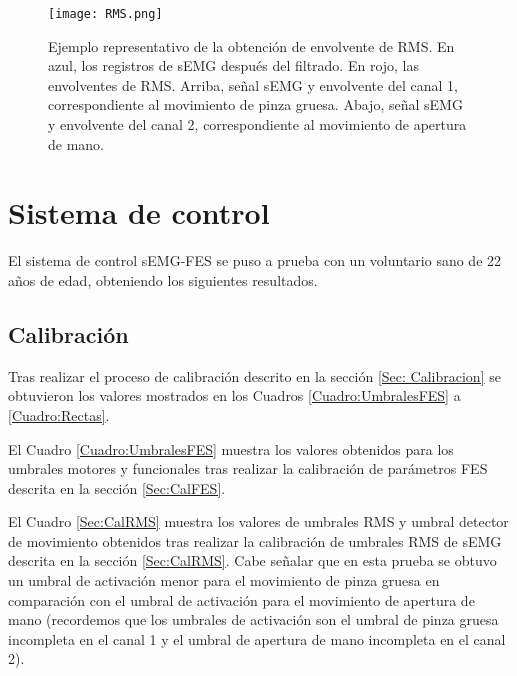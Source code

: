 
\begin{figure}[htbp]
	\centering
	\texttt{[image: RMS.png]}
	\caption[Ejemplo representativo de la obtención de envolvente de RMS]{Ejemplo representativo de la obtención de envolvente de RMS. En azul, los registros de sEMG después del filtrado. En rojo, las envolventes de RMS. Arriba, señal sEMG y envolvente del canal 1, correspondiente al movimiento de pinza gruesa. Abajo, señal sEMG y envolvente del canal 2, correspondiente al movimiento de apertura de mano.}
	\label{Figura: RMS}
\end{figure}


\newpage
\section{Sistema de control}
El sistema de control sEMG-FES se puso a prueba con un voluntario sano de 22 años de edad, obteniendo los siguientes resultados.

\subsection{Calibración}
Tras realizar el proceso de calibración descrito en la sección \ref{Sec: Calibracion} se obtuvieron los valores mostrados en los Cuadros \ref{Cuadro:UmbralesFES} a \ref{Cuadro:Rectas}.

El Cuadro \ref{Cuadro:UmbralesFES} muestra los valores obtenidos para los umbrales motores y funcionales tras realizar la calibración de parámetros FES descrita en la sección \ref{Sec:CalFES}.

El Cuadro \ref{Sec:CalRMS} muestra los valores de umbrales RMS y umbral detector de movimiento obtenidos tras realizar la calibración de umbrales RMS de sEMG descrita en la sección \ref{Sec:CalRMS}. Cabe señalar que en esta prueba se obtuvo un umbral de activación menor para el movimiento de pinza gruesa en comparación con el umbral de activación para el movimiento de apertura de mano (recordemos que los umbrales de activación son el umbral de pinza gruesa incompleta en el canal 1 y el umbral de apertura de mano incompleta en el canal 2).

